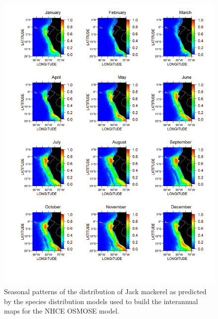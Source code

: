 \begin{figure}
\centering
\includegraphics[height=0.8\textheight]{figures/jurel-climatology}
\caption[Seasonal patterns of the distribution of Jack mackerel]{Seasonal patterns of the distribution of Jack mackerel as predicted by the species distribution models used to build the interannual maps for the NHCE OSMOSE model.}
\label{fig:jurel-climatology}
\end{figure}

